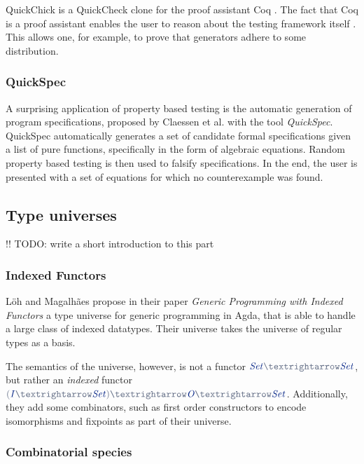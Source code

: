 \documentclass[a4paper,msc,twosized=semi]{uustthesis}
\newcommand*{\mathcolor}{}
\def\mathcolor#1#{\mathcoloraux{#1}}
\newcommand*{\mathcoloraux}[3]{%
  \protect\leavevmode
  \begingroup
    \color#1{#2}#3%
  \endgroup
}
\newcommand{\HSSpecial}[1]{\mathcolor{hsblue4}{#1}}
\newcommand{\HSSym}[1]{\mathcolor{hsblue4}{#1}}
\newcommand{\HSCon}[1]{\mathcolor{hsblue3}{\mathit{#1}}}
\begin{document}
  QuickChick is a QuickCheck clone for the proof assistant Coq \cite
  {denes2014quickchick}. The fact that Coq is a proof assistant enables the user to 
  reason about the testing framework itself \cite{paraskevopoulou2015foundational}. 
  This allows one, for example, to prove that generators adhere to some distribution. 

\subsubsection{QuickSpec}

  A surprising application of property based testing is the automatic generation of 
  program specifications, proposed by Claessen et al. \cite{claessen2010quickspec} 
  with the tool \textit{QuickSpec}. QuickSpec automatically generates a set of 
  candidate formal specifications given a list of pure functions, specifically in the 
  form of algebraic equations. Random property based testing is then used to falsify 
  specifications. In the end, the user is presented with a set of equations for which 
  no counterexample was found.  

\subsection{Type universes}

  !! TODO: write a short introduction to this part

\subsubsection{Indexed Functors}

  Löh and Magalhães propose in their paper \emph{Generic Programming with Indexed 
  Functors} \cite{loh2011generic} a type universe for generic programming in Agda, 
  that is able to handle a large class of indexed datatypes. Their universe takes the 
  universe of regular types as a basis. 
  
  The semantics of the universe, however, is not a functor \ensuremath{\HSCon{Set}\HSSym{→}\HSCon{Set}}, but rather an 
  \emph{indexed} functor \ensuremath{\HSSpecial{(}\HSCon{I}\HSSym{→}\HSCon{Set}\HSSpecial{)}\HSSym{→}\HSCon{O}\HSSym{→}\HSCon{Set}}. Additionally, they add some 
  combinators, such as first order constructors to encode isomorphisms and fixpoints 
  as part of their universe. 

\subsubsection{Combinatorial species}
\end{document}
